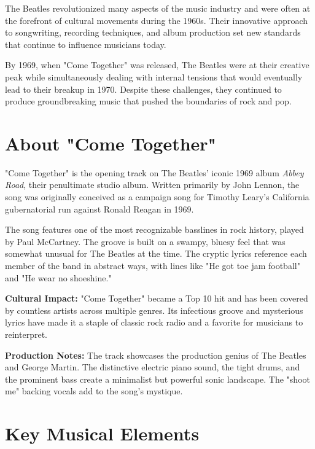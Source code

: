 \documentclass[11pt,letterpaper]{article}
\begin{document}
The Beatles revolutionized many aspects of the music industry and were often at the forefront of cultural movements during the 1960s. Their innovative approach to songwriting, recording techniques, and album production set new standards that continue to influence musicians today.

By 1969, when "Come Together" was released, The Beatles were at their creative peak while simultaneously dealing with internal tensions that would eventually lead to their breakup in 1970. Despite these challenges, they continued to produce groundbreaking music that pushed the boundaries of rock and pop.

\vspace{0.5cm}

\section*{About "Come Together"}

"Come Together" is the opening track on The Beatles' iconic 1969 album \textit{Abbey Road}, their penultimate studio album. Written primarily by John Lennon, the song was originally conceived as a campaign song for Timothy Leary's California gubernatorial run against Ronald Reagan in 1969.

The song features one of the most recognizable basslines in rock history, played by Paul McCartney. The groove is built on a swampy, bluesy feel that was somewhat unusual for The Beatles at the time. The cryptic lyrics reference each member of the band in abstract ways, with lines like "He got toe jam football" and "He wear no shoeshine."

\textbf{Cultural Impact:} "Come Together" became a Top 10 hit and has been covered by countless artists across multiple genres. Its infectious groove and mysterious lyrics have made it a staple of classic rock radio and a favorite for musicians to reinterpret.

\textbf{Production Notes:} The track showcases the production genius of The Beatles and George Martin. The distinctive electric piano sound, the tight drums, and the prominent bass create a minimalist but powerful sonic landscape. The "shoot me" backing vocals add to the song's mystique.

\vspace{0.5cm}

\section*{Key Musical Elements}
\end{document}
